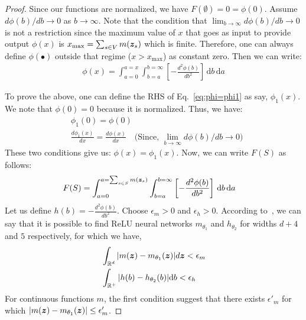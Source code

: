 \documentclass{article}
\def\d{\mathrm{d}}
\renewcommand{\cite}{\citep}
\begin{document}
\begin{proof}
Since our functions are normalized, we have $F(\emptyset) = 0=\phi(0)$.  Assume $d\phi(b)/db \to 0$ as $b\to \infty$. 
 Note that the condition that $\lim_{b\to\infty} d\phi(b)/db \to 0$ is not a restriction since the maximum value of $x$ that goes as input to provide output $\phi(x)$ is $x_{\max} = \sum_{s\in V} m (\bm{z}_s)$ which is finite. Therefore, one can always define $\phi(\bullet)$ outside that regime ($x>x_{\max}$) as constant zero. Then we can write:
\begin{align}
    \phi(x) = \int_{a=0} ^{a=x} \int_{b=a} ^{b=\infty} \left[-\frac{d^2\phi (b)}{db^2}\right] \, \d b \, \d a   \label{eq:phi=phi1}
\end{align}
 
To prove the above, one can define the RHS of Eq.~\eqref{eq:phi=phi1} as say, $\phi_1(x)$.
We note that $\phi(0)=0$ because it is normalized. Thus,
we have:
\begin{align}
    &\phi_1(0)=\phi(0) \\
    &\frac{d\phi_1(x)}{dx}=\frac{d\phi(x)}{dx} \quad \text{(Since, $\lim_{b\to\infty} d\phi(b)/db \to 0$)} 
\end{align}
These two conditions give us:
$\phi(x) = \phi_1(x)$. Now, we can write $F(S)$ as follows:
 \begin{align}
 F(S) & =   \int_{a=0} ^{a=\sum_{s\in S}m(\zb_s)} \int_{b=a} ^{b=\infty} \left[-\frac{d^2\phi (b)}{db^2}\right] \, \d b \, \d a\end{align}
Let us define $h(b) =-\frac{d^2\phi (b)}{db^2} $. Choose $\epsilon_m >0$ and $\epsilon_h>0$. According to~\cite[Theorem 1]{lu2017expressive}, we can say that it is possible to find ReLU neural networks $m_{\theta_1}$ and $h_{\theta_2}$ for widths $d+4$ and $5$ respectively, for which
we have, 
\begin{align}
&    \int_{\RR^d}|m(\zb)-m_{\theta_1}(\zb)| d\zb < \epsilon_m\\
& \int_{\RR^+ }|h(b)-h_{\theta_2}(b)| \d b < \epsilon_h
\end{align}
For continuous functions $m$,  the first condition suggest that there exists $\epsilon' _m$ for which $|m(\bm{z})-m_{\theta_1}(\bm{z})| \le \epsilon' _m$. 


\end{proof}
\end{document}
